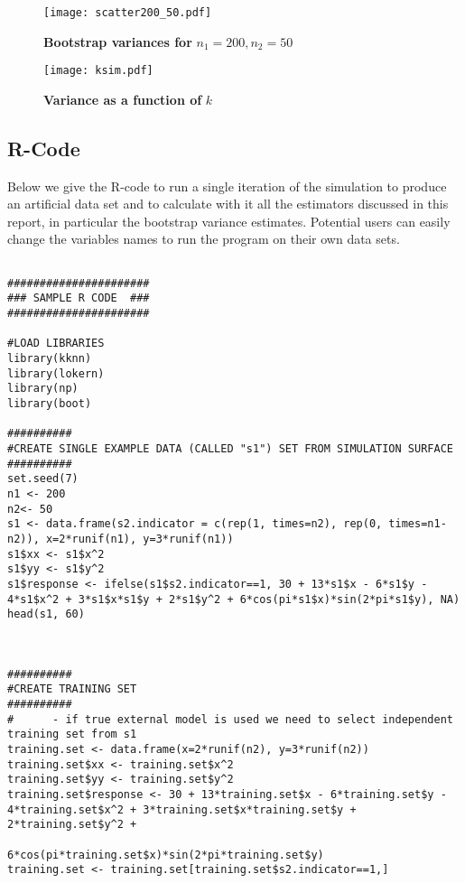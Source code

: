 \documentclass[a4paper,12pt,leqno, titlepage]{article}
\begin{document}
\begin{appendix}
{{{\clearpage\newpage
\begin{figure}[h]
\begin{center}
\caption{\label{boot2} \textbf{Bootstrap variances for} $n_1=200,n_2=50$}
\end{center}
\begin{center}
\texttt{[image: scatter200\_50.pdf]}
\end{center}
\end{figure}
\clearpage\newpage
\begin{figure}[h]
\begin{center}
\caption{\label{choiceofksim} \textbf{Variance as a function of} $k$}
\end{center}
\begin{center}
\texttt{[image: ksim.pdf]}
\end{center}
\end{figure}
\newpage
\subsection{R-Code}\label{appendix_R_code}
Below we give the R-code to run a single iteration of the simulation to produce an artificial data set and to calculate with it all the estimators discussed in this report, in particular the bootstrap variance estimates. Potential users can easily change the variables names to run the program on their own data sets.
\tiny{
\begin{verbatim}

######################
### SAMPLE R CODE  ###
######################

#LOAD LIBRARIES
library(kknn)
library(lokern)
library(np)
library(boot)

##########
#CREATE SINGLE EXAMPLE DATA (CALLED "s1") SET FROM SIMULATION SURFACE
##########
set.seed(7)
n1 <- 200
n2<- 50
s1 <- data.frame(s2.indicator = c(rep(1, times=n2), rep(0, times=n1-n2)), x=2*runif(n1), y=3*runif(n1))
s1$xx <- s1$x^2
s1$yy <- s1$y^2
s1$response <- ifelse(s1$s2.indicator==1, 30 + 13*s1$x - 6*s1$y - 4*s1$x^2 + 3*s1$x*s1$y + 2*s1$y^2 + 6*cos(pi*s1$x)*sin(2*pi*s1$y), NA)
head(s1, 60)



##########
#CREATE TRAINING SET
##########
#      - if true external model is used we need to select independent training set from s1
training.set <- data.frame(x=2*runif(n2), y=3*runif(n2))
training.set$xx <- training.set$x^2
training.set$yy <- training.set$y^2
training.set$response <- 30 + 13*training.set$x - 6*training.set$y - 4*training.set$x^2 + 3*training.set$x*training.set$y + 2*training.set$y^2 +
                         6*cos(pi*training.set$x)*sin(2*pi*training.set$y)
training.set <- training.set[training.set$s2.indicator==1,]


\end{verbatim}}}}}
\end{appendix}
\end{document}
